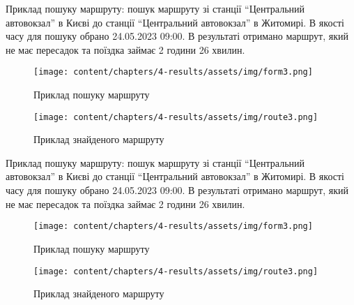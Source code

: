 Приклад пошуку маршруту: пошук маршруту зі станції ``Центральний автовокзал'' в Києві до станції ``Центральний автовокзал'' в Житомирі. В якості часу для пошуку обрано 24.05.2023 09:00. В результаті отримано маршрут, який не має пересадок та поїздка займає 2 години 26 хвилин.

\begin{figure}[!htp]
	\centering
	\texttt{[image: content/chapters/4-results/assets/img/form3.png]}
	\caption{Приклад пошуку маршруту}
	\label{fig:form3}
\end{figure}

\begin{figure}[!htp]
	\centering
	\texttt{[image: content/chapters/4-results/assets/img/route3.png]}
	\caption{Приклад знайденого маршруту}
	\label{fig:route3}
\end{figure}

Приклад пошуку маршруту: пошук маршруту зі станції ``Центральний автовокзал'' в Києві до станції ``Центральний автовокзал'' в Житомирі. В якості часу для пошуку обрано 24.05.2023 09:00. В результаті отримано маршрут, який не має пересадок та поїздка займає 2 години 26 хвилин.

\begin{figure}[!htp]
	\centering
	\texttt{[image: content/chapters/4-results/assets/img/form3.png]}
	\caption{Приклад пошуку маршруту}
	\label{fig:form3}
\end{figure}

\begin{figure}[!htp]
	\centering
	\texttt{[image: content/chapters/4-results/assets/img/route3.png]}
	\caption{Приклад знайденого маршруту}
	\label{fig:route3}
\end{figure}

